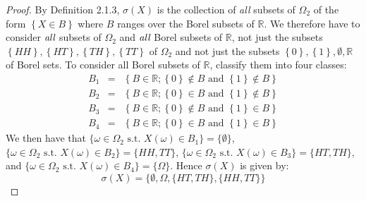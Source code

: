 \documentclass{article}
\newcommand{\st}{\text{ s.t. }}
\newcommand{\seq}[1]{\{ #1 \}}
\theoremstyle{definition}
\theoremstyle{definition}
\begin{document}
\begin{enumerate}
\begin{enumerate}[(i)]
    
    \begin{proof} 
    By Definition 2.1.3, $\sigma \left( X\right) $ is the collection of \emph{all%
} subsets of $\Omega _{2}$ of the form $\left\{ X\in B\right\} $ where $B$
ranges over the Borel subsets of $\mathbb{R}$. We therefore have to consider 
$\emph{all}$ subsets of $\Omega _{2}$ and $\emph{all}$ Borel subsets of $%
\mathbb{R}$, not just the subsets $\left\{ HH\right\} ,\left\{ HT\right\}
,\left\{ TH\right\} ,\left\{ TT\right\} $ of $\Omega _{2}$ and not just the
subsets $\left\{ 0\right\} ,\left\{ 1\right\} ,\emptyset ,\mathbb{R}$ of
Borel sets. To consider all Borel subsets of $\mathbb{R}$, classify them
into four classes:%
\begin{eqnarray*}
B_{1} &=&\left\{ B\in \mathbb{R};\left\{ 0\right\} \notin B\text{ and }%
\left\{ 1\right\} \notin B\right\}  \\
B_{2} &=&\left\{ B\in \mathbb{R};\left\{ 0\right\} \in B\text{ and }\left\{
1\right\} \notin B\right\}  \\
B_{3} &=&\left\{ B\in \mathbb{R};\left\{ 0\right\} \notin B\text{ and }%
\left\{ 1\right\} \in B\right\}  \\
B_{4} &=&\left\{ B\in \mathbb{R};\left\{ 0\right\} \in B\text{ and }\left\{
1\right\} \in B\right\} 
\end{eqnarray*}
We then have that $\seq{\omega \in \Omega_2 \st X(\omega) \in B_1} = \seq{\emptyset}$, $\seq{\omega \in \Omega_2 \st X(\omega) \in B_2} = \seq{HH,TT}$, $\seq{\omega \in \Omega_2 \st X(\omega) \in B_3} = \seq{HT,TH}$, and $\seq{\omega \in \Omega_2 \st X(\omega) \in B_4} = \seq{\Omega}$. Hence $\sigma(X)$ is given by:
        $$\sigma(X) = \seq{ \emptyset, \Omega, \seq{HT,TH},\seq{HH,TT}}$$
    \end{proof}
    

\end{enumerate}
\end{enumerate}
\end{document}
